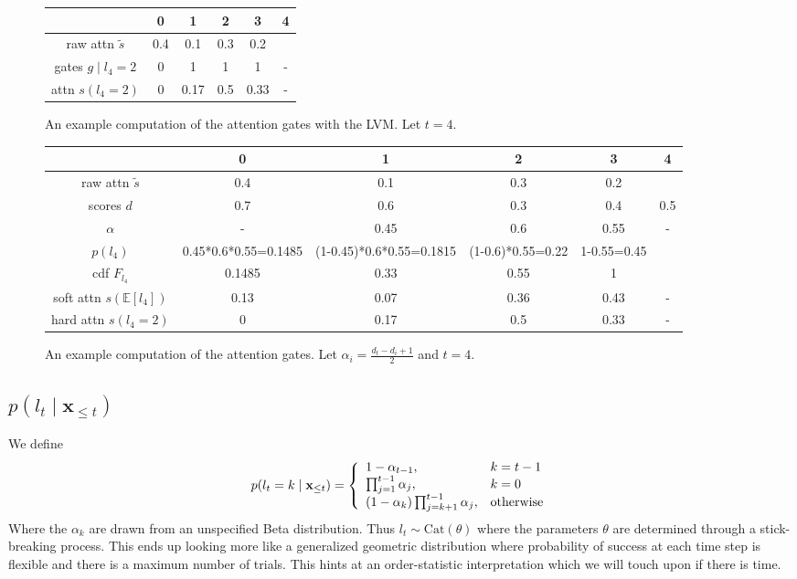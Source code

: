 \documentclass{article}
\newcommand{\Cat}{\mathrm{Cat}}
\newcommand\E[1]{\mathbb{E}\left[#1\right]}
\newcommand{\bx}{\mathbf{x}}
\begin{document}
\begin{figure}
\centering
\begin{tabular}{|c|c|c|c|c|c|}
\hline
& 0 & 1 & 2 & 3 & 4\\
\hline
raw attn $\tilde{s}$ & 0.4 & 0.1 & 0.3 & 0.2 & \\
\hline
gates $g\mid l_4=2$         & 0   & 1   & 1   & 1   & - \\
\hline
attn $s(l_4=2)$     & 0 & 0.17 & 0.5 & 0.33 & -\\
\hline
\end{tabular}
\caption{An example computation of the attention gates with the LVM. Let $t=4$.}
\label{fig:hard}
\end{figure}
\begin{figure}
\centering
\begin{tabular}{|c|c|c|c|c|c|}
\hline
& 0 & 1 & 2 & 3 & 4\\
\hline
raw attn $\tilde{s}$ & 0.4 & 0.1 & 0.3 & 0.2 & \\
\hline
scores $d$         & 0.7 & 0.6 & 0.3 & 0.4 & 0.5\\
\hline
$\alpha$    & - & 0.45 & 0.6 & 0.55 & -\\
\hline
$p(l_4)$    & 0.45*0.6*0.55=0.1485 & (1-0.45)*0.6*0.55=0.1815 & (1-0.6)*0.55=0.22 & 1-0.55=0.45 &\\
\hline
cdf $F_{l_4}$   & 0.1485 & 0.33 & 0.55 & 1 &\\
\hline
soft attn $s(\E{l_4})$ & 0.13 & 0.07 & 0.36 & 0.43 & -\\
\hline
hard attn $s(l_4=2)$     & 0 & 0.17 & 0.5 & 0.33 & -\\
\hline
\end{tabular}
\caption{An example computation of the attention gates.
Let $\alpha_i = \frac{d_t-d_i+1}{2}$ and $t=4$.}
\label{fig:soft}
\end{figure}

\subsection{$p(l_t\mid\bx_{\le t})$}
We define
\begin{equation}
p(l_t=k\mid\bx_{\le t}) =\left\{\begin{array}{l l}
1-\alpha_{t-1}, & k=t-1\\
\prod_{j=1}^{t-1}\alpha_j, & k=0\\
(1-\alpha_k)\prod_{j=k+1}^{t-1}\alpha_j, & \textrm{otherwise}
\end{array}\right.
\end{equation}
Where the $\alpha_k$ are drawn from an unspecified Beta distribution.
Thus $l_t\sim\Cat(\theta)$ where the parameters $\theta$ are determined
through a stick-breaking process. 
This ends up looking more like a generalized geometric distribution
where probability of success at each time step is flexible and there is a 
maximum number of trials.
This hints at an order-statistic interpretation which 
we will touch upon if there is time.
\end{document}
